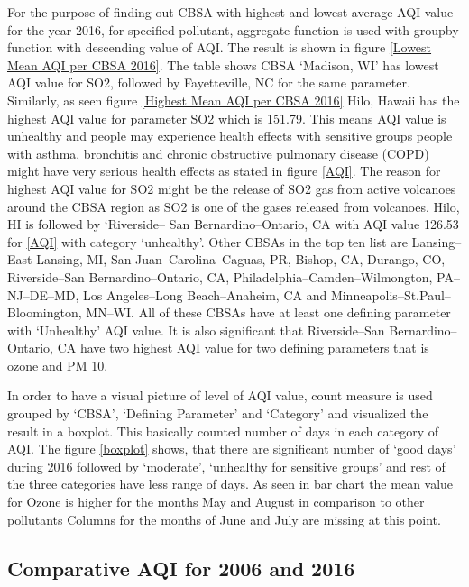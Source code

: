 \documentclass[sigconf]{acmart}
\begin{document}
   For the purpose of finding out CBSA with highest and lowest average  AQI value for the year 2016, for specified pollutant, aggregate function is used with groupby function with descending value of AQI. The result is shown in figure \ref{Lowest Mean AQI per CBSA 2016}. The table shows CBSA `Madison, WI' has lowest AQI value for SO2, followed by Fayetteville, NC for the same parameter.
   Similarly, as seen figure \ref{Highest Mean AQI per CBSA 2016} Hilo, Hawaii has the highest AQI value for parameter SO2 which is 151.79. This means AQI value is unhealthy and people may experience health effects with sensitive groups people with asthma, bronchitis and chronic obstructive pulmonary disease (COPD) might have very serious health effects as stated in figure \ref{AQI}. The reason for highest AQI value for SO2 might be the release of SO2 gas from active volcanoes around the CBSA region as SO2 is one of the gases released from volcanoes. Hilo, HI is followed by `Riverside-- San Bernardino--Ontario, CA with AQI value 126.53 for  \ref{AQI} with category `unhealthy'. Other CBSAs in the top ten list are Lansing--East Lansing, MI, San Juan--Carolina--Caguas, PR, Bishop, CA, Durango, CO, Riverside--San Bernardino--Ontario, CA, Philadelphia--Camden--Wilmongton, PA--NJ--DE--MD, Los Angeles--Long Beach--Anaheim, CA and Minneapolis--St.Paul--Bloomington, MN--WI. All of these CBSAs have at least one defining parameter with `Unhealthy' AQI value. It is also significant that Riverside--San Bernardino--Ontario, CA have two highest AQI value for two defining parameters that is ozone and PM 10.

   In order to have a visual picture of level of AQI value, count measure is used grouped by `CBSA', `Defining Parameter' and `Category' and visualized the result in a boxplot. This basically counted number of days in each category of AQI. The figure \ref{boxplot} shows, that there are significant number of `good days' during 2016 followed by `moderate', `unhealthy for sensitive groups' and rest of the three categories have less range of days. As seen in bar chart the mean value for Ozone is higher for the months May and August in comparison to other pollutants Columns for the months of June and July are missing at this point.


\subsection{Comparative AQI for 2006 and 2016}
\end{document}

